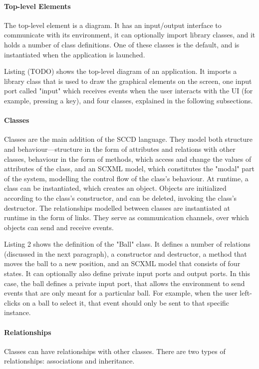 \paragraph{Top-level Elements}
The top-level element is a diagram. It has an input/output interface to communicate with its environment, it can optionally 
import library classes, and it holds a number of class definitions. One of these classes is the default, and is instantiated 
when the application is launched.


Listing (TODO) shows the top-level diagram of an application. It imports a library class that is used to draw the graphical 
elements on the screen, one input port called "input" which receives events when the user interacts with the UI (for example, 
pressing a key), and four classes, explained in the following subsections.

\paragraph{Classes}
Classes are the main addition of the SCCD language. They model both structure and behaviour—structure in the form of 
attributes and relations with other classes, behaviour in the form of methods, which access and change the values of 
attributes of the class, and an SCXML model, which constitutes the "modal" part of the system, modelling the control flow 
of the class's behaviour. At runtime, a class can be instantiated, which creates an object. Objects are initialized according 
to the class's constructor, and can be deleted, invoking the class's destructor. The relationships modelled between classes 
are instantiated at runtime in the form of links. They serve as communication channels, over which objects can send and receive 
events.


Listing 2 shows the definition of the "Ball" class. It defines a number of relations (discussed in the next paragraph), a 
constructor and destructor, a method that moves the ball to a new position, and an SCXML model that consists of four states. 
It can optionally also define private input ports and output ports. In this case, the ball defines a private input port, that 
allows the environment to send events that are only meant for a particular ball. For example, when the user left-clicks on a 
ball to select it, that event should only be sent to that specific instance.

\paragraph{Relationships}
Classes can have relationships with other classes. There are two types of relationships: associations and inheritance.

